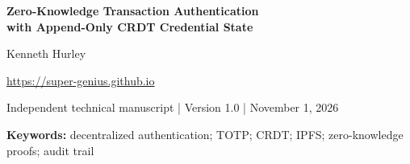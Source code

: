 \documentclass[10pt,letterpaper]{article}
\begin{document}
\begin{center}
{\Large\bfseries Zero-Knowledge Transaction Authentication\\with Append-Only CRDT Credential State\par}
\vspace{7pt}
{\normalsize Kenneth Hurley\par}
\vspace{2pt}
{\small \url{https://super-genius.github.io}\par}
\vspace{4pt}
{\footnotesize Independent technical manuscript \quad | \quad Version 1.0 \quad | \quad November 1, 2026}
\end{center}
\begin{abstract}
Decentralized applications need transaction authentication that remains auditable when account data is replicated among nodes. This manuscript describes an architecture that combines two-factor authentication, encrypted credential storage, a zero-knowledge transaction authorization concept, and an append-only conflict-free replicated data type (CRDT) over content-addressed storage. It outlines credential enrollment, transaction authorization, independent verification, secret rotation, and recovery, then separates the guarantees of each layer. The design aims to preserve transaction integrity while minimizing disclosure of authentication secrets. No working end-to-end proving system, formal convergence proof, or benchmark measurements are asserted.
\end{abstract}
\vspace{3pt}
\noindent\textbf{Keywords:} decentralized authentication; TOTP; CRDT; IPFS; zero-knowledge proofs; audit trail
\vspace{15pt}
\end{document}
